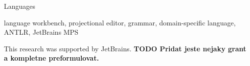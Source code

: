 \documentclass[preprint,10pt,numbers]{sigplanconf}
\newcommand{\todo}[1]{{\bfseries TODO #1}}
\begin{document}

\terms
Languages

\keywords
language workbench, projectional editor, grammar, domain-specific language, ANTLR, JetBrains MPS










\acks
This research was supported by JetBrains. \todo{Pridat jeste nejaky grant a kompletne preformulovat.}


\end{document}
